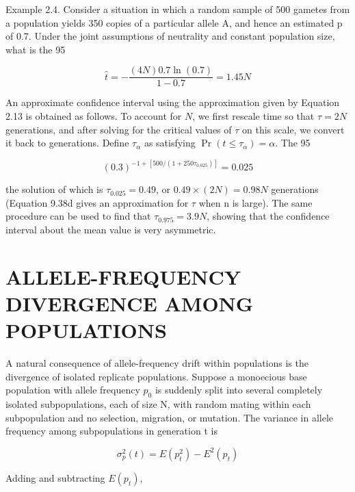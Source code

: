 \documentclass{article}
\begin{document}
Example 2.4. Consider a situation in which a random sample of 500 gametes from a population yields 350 copies of a particular allele A, and hence an estimated p of 0.7. Under the joint assumptions of neutrality and constant population size, what is the 95%

\begin{equation}
\widehat{t}=-\frac{(4N)0.7\ln(0.7)}{1-0.7}=1.45N
\end{equation}

An approximate confidence interval using the approximation given by Equation 2.13 is obtained as follows. To account for $N$, we first rescale time so that $\tau = 2N$ generations, and after solving for the critical values of $\tau$ on this scale, we convert it back to generations. Define $\tau_\alpha$ as satisfying $\Pr(t \leq \tau_\alpha) = \alpha$. The 95%

\begin{equation}
(0.3)^{-1+[500/(1+250\tau_{0.025})]}=0.025
\end{equation}

the solution of which is  $ \tau_{0.025} = 0.49 $, or  $ 0.49 \times (2N) = 0.98N $ generations (Equation 9.38d gives an approximation for  $ \tau $ when n is large). The same procedure can be used to find that  $ \tau_{0.975} = 3.9N $, showing that the confidence interval about the mean value is very asymmetric.

\section{ALLELE-FREQUENCY DIVERGENCE AMONG POPULATIONS}
A natural consequence of allele-frequency drift within populations is the divergence of isolated replicate populations. Suppose a monoecious base population with allele frequency  $ p_{0} $ is suddenly split into several completely isolated subpopulations, each of size N, with random mating within each subpopulation and no selection, migration, or mutation. The variance in allele frequency among subpopulations in generation t is

\begin{equation}
\sigma_{p}^{2}(t)=E(p_{t}^{2})-E^{2}(p_{t})
\end{equation}

Adding and subtracting  $ E(p_{t}) $,
\end{document}
